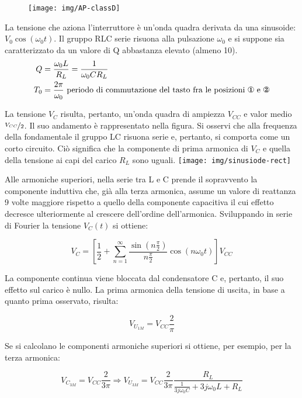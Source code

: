 \begin{figure}[htb]
\centering
\texttt{[image: img/AP-classD]}
\caption{}
\label{fig:ap-classd}
\end{figure}

La tensione che aziona l'interruttore è un'onda quadra derivata da una sinusoide:
$V_0 \cos ( \omega_0 t )$. Il gruppo RLC serie risuona alla pulsazione $\omega_0$ e si suppone sia caratterizzato da un valore di Q abbastanza elevato (almeno 10).
$$
\begin{aligned}
Q & =\frac{\omega_0 L}{R_L} = \frac{1}{\omega_0 C R_L}\\
T_0 &= \frac{2 \pi}{\omega_0} \mbox{ periodo di commutazione del tasto fra le posizioni \ding{172} e \ding{173}}
\end{aligned}
$$

\begin{multicols}{2}
\null\vfill
La tensione $V_C$ risulta, pertanto, un'onda quadra di ampiezza $V_{CC}$ e valor medio $\nicefrac{V_{CC}}{2}$. Il suo andamento è rappresentato nella figura. Si osservi che alla frequenza della fondamentale il
gruppo LC risuona serie e, pertanto, si comporta come un corto circuito. Ciò significa che la componente di prima armonica di $V_C$ e quella della tensione ai capi del carico $R_L$ sono uguali.
\vfill\null
\columnbreak
\centering
\texttt{[image: img/sinusiode-rect]}
\end{multicols}

Alle armoniche superiori, nella serie tra L e C prende il sopravvento la componente induttiva che,
già alla terza armonica, assume un valore di reattanza 9 volte maggiore rispetto a quello della
componente capacitiva il cui effetto decresce ulteriormente al crescere dell'ordine dell'armonica.
Sviluppando in serie di Fourier la tensione $V_C (t)$ si ottiene:

$$V_C = \left[ \frac{1}{2} +
\sum_{n=1}^{\infty} \frac{\sin \left( n \frac{\pi}{2} \right)}{n \frac{\pi}{2}} \cos (n \omega_0 t) \right] V_{CC}$$

La componente continua viene bloccata dal condensatore C e, pertanto, il suo effetto sul carico è
nullo. La prima armonica della tensione di uscita, in base a quanto prima osservato, risulta:

$$V_{U_{1M}} = V_{CC} \frac{2}{\pi}$$

Se si calcolano le componenti armoniche superiori si ottiene, per esempio, per la terza armonica:

\[V_{C_{3M}} = V_{CC} \frac{2}{3 \pi} \Rightarrow V_{U_{3M}} = 
V_{CC} \frac{2}{3 \pi} \frac{R_L}{\frac{1}{3j\omega_0 C} + 3j\omega_0 L + R_L}
\]

